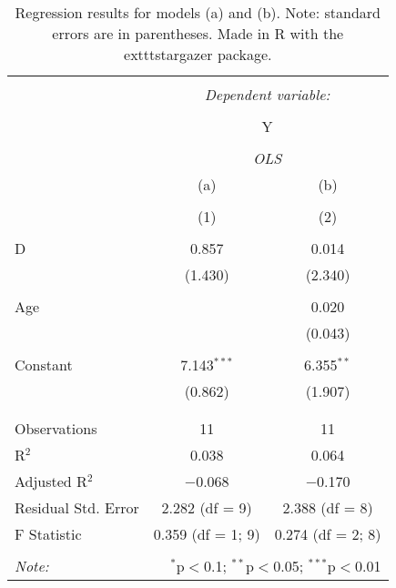 
\begin{table}[!htbp] \centering 
  \caption{Regression results for models (a) and (b). Note: standard errors are in parentheses. Made in R with the 	exttt{stargazer} package.} 
  \label{} 
\begin{tabular}{@{\extracolsep{5pt}}lcc} 
\\[-1.8ex]\hline 
\hline \\[-1.8ex] 
 & \multicolumn{2}{c}{\textit{Dependent variable:}} \\ 
\cline{2-3} 
\\[-1.8ex] & \multicolumn{2}{c}{Y} \\ 
\\[-1.8ex] & \multicolumn{2}{c}{\textit{OLS}} \\ 
 & (a) & (b) \\ 
\\[-1.8ex] & (1) & (2)\\ 
\hline \\[-1.8ex] 
 D & 0.857 & 0.014 \\ 
  & (1.430) & (2.340) \\ 
  & & \\ 
 Age &  & 0.020 \\ 
  &  & (0.043) \\ 
  & & \\ 
 Constant & 7.143$^{***}$ & 6.355$^{**}$ \\ 
  & (0.862) & (1.907) \\ 
  & & \\ 
\hline \\[-1.8ex] 
Observations & 11 & 11 \\ 
R$^{2}$ & 0.038 & 0.064 \\ 
Adjusted R$^{2}$ & $-$0.068 & $-$0.170 \\ 
Residual Std. Error & 2.282 (df = 9) & 2.388 (df = 8) \\ 
F Statistic & 0.359 (df = 1; 9) & 0.274 (df = 2; 8) \\ 
\hline 
\hline \\[-1.8ex] 
\textit{Note:}  & \multicolumn{2}{r}{$^{*}$p$<$0.1; $^{**}$p$<$0.05; $^{***}$p$<$0.01} \\ 
\end{tabular} 
\end{table} 
